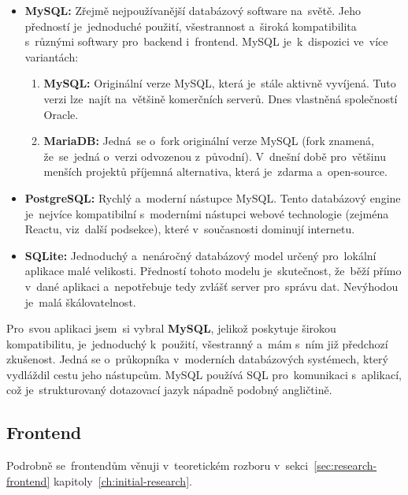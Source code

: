 \begin{itemize}
    \item \textbf{MySQL:} Zřejmě nejpoužívanější databázový software na~světě.
        Jeho předností je~jednoduché použití, všestrannost a~široká
        kompatibilita s~různými softwary pro~backend i~frontend. MySQL
        je~k~dispozici ve~více variantách:
        \begin{enumerate}
            \item \textbf{MySQL:} Originální verze MySQL, která je~stále
                aktivně vyvíjená. Tuto verzi lze~najít na~většině komerčních
                serverů. Dnes vlastněná společností Oracle.
            \item \textbf{MariaDB:} Jedná~se o~fork originální verze MySQL
                (fork znamená, že~se~jedná o~verzi odvozenou z~původní).
                V~dnešní době pro~většinu menších projektů příjemná
                alternativa, která je~zdarma a~open-source.
        \end{enumerate}
    \item \textbf{PostgreSQL:} Rychlý a~moderní nástupce MySQL. Tento
        databázový engine je~nejvíce kompatibilní s~moderními nástupci
        webové technologie (zejména Reactu, viz~další podsekce), které
        v~současnosti dominují internetu.
    \item \textbf{SQLite:} Jednoduchý a~nenáročný databázový model určený
        pro~lokální aplikace malé velikosti. Předností tohoto modelu
        je~skutečnost, že~běží přímo v~dané aplikaci a~nepotřebuje tedy
        zvlášť server pro~správu dat. Nevýhodou je~malá škálovatelnost.
\end{itemize}

Pro~svou aplikaci jsem~si vybral \textbf{MySQL}, jelikož poskytuje širokou
kompatibilitu, je~jednoduchý k~použití, všestranný a~mám s~ním již předchozí
zkušenost. Jedná se o~průkopníka v~moderních databázových systémech, který
vydláždil cestu jeho nástupcům. MySQL používá SQL pro~komunikaci s~aplikací,
což je~strukturovaný dotazovací jazyk nápadně podobný angličtině.

\subsection{Frontend}
\label{sec:preps-frontend}

Podrobně se~frontendům věnuji v~teoretickém rozboru
v~sekci~\ref{sec:research-frontend} kapitoly~\ref{ch:initial-research}.

